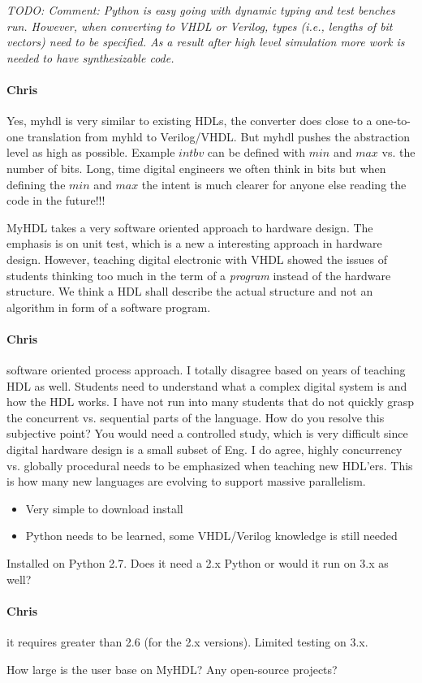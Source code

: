\documentclass[10pt, technote, draftcls, onecolumn]{IEEEtran}
\newcommand{\todo}[1]{{\emph{TODO: #1}}}
\newcommand{\comment}[3]{\paragraph*{\textbf{#1}}{\color{#3}#2}}
\newcommand{\cfelton}[1]{\comment{Chris}{#1}{Blue}}
\begin{document}
\todo{Comment: Python is easy going with dynamic typing and test benches run.
However, when converting to VHDL or Verilog, types (i.e., lengths of bit vectors)
need to be specified. As a result after high level simulation more work is needed
to have synthesizable code.}

\cfelton{Yes, myhdl is very similar to existing HDLs, the converter does close 
to a one-to-one translation from myhld to Verilog/VHDL.  But myhdl pushes the 
abstraction level as high as possible.  Example $intbv$ can be defined with 
$min$ and $max$ vs. the number of bits.  Long, time digital engineers we often
think in bits but when defining the $min$ and $max$ the intent is much clearer
for anyone else reading the code in the future!!!}

MyHDL takes a very software oriented approach to hardware design. The emphasis
is on unit test, which is a new a interesting approach in hardware design.
However, teaching digital electronic with VHDL showed the issues of students
thinking too much in the term of a \emph{program} instead of the hardware
structure. We think a HDL shall describe the actual structure and not an
algorithm in form of a software program.

\cfelton{software oriented \b{process} approach.  I totally disagree based on 
years of teaching HDL as well.  Students need to understand what a complex
digital system is and how the HDL works.  I have not run into many students
that do not quickly grasp the concurrent vs. sequential parts of the language.
How do you resolve this subjective point?  You would need a controlled study,
which is very difficult since digital hardware design is a small subset of 
Eng.  I do agree, highly concurrency vs. globally procedural needs to be 
emphasized when teaching new HDL'ers.  This is how many new languages are
evolving to support massive parallelism.}

\begin{itemize}
\item Very simple to download install
\item Python needs to be learned, some VHDL/Verilog knowledge is still needed
\end{itemize}

Installed on Python 2.7. Does it need a 2.x Python or would it run on 3.x as well?

\cfelton{it requires greater than 2.6 (for the 2.x versions).  Limited testing 
on 3.x.}

How large is the user base on MyHDL? Any open-source projects?
\end{document}
